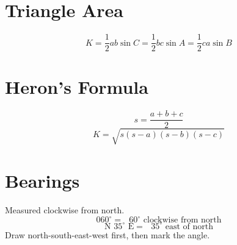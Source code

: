 \documentclass[11pt]{article}
\begin{document}
\section*{Triangle Area}
\[
K=\frac12 ab\sin C=\frac12 bc\sin A=\frac12 ca\sin B
\]

\section*{Heron's Formula}
\[
s=\frac{a+b+c}{2}
\]
\[
K=\sqrt{s(s-a)(s-b)(s-c)}
\]

\section*{Bearings}
Measured clockwise from north.
\[
060^\circ=\text{ }60^\circ \text{ clockwise from north}
\]
\[
\text{N }35^\circ\text{ E}=\text{ }35^\circ \text{ east of north}
\]
Draw north-south-east-west first, then mark the angle.
\end{document}
